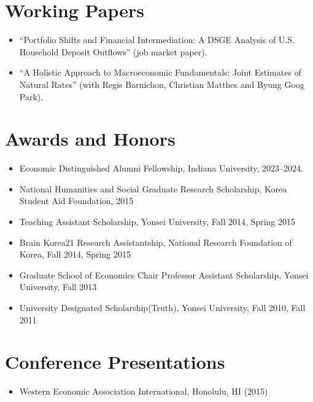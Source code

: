 \documentclass[11pt,a4paper]{article}
\begin{document}
\section*{Working Papers} 
\begin{itemize}[leftmargin=*]
    \item ``Portfolio Shifts and Financial Intermediation: A DSGE Analysis of U.S. Household Deposit Outflows'' (job market paper).
    \item ``A Holistic Approach to Macroeconomic
        Fundamentals: Joint Estimates of
        Natural Rates'' (with Regis Barnichon, Christian Matthes and Byung Goog Park).    
\end{itemize}

\section*{Awards and Honors}
\begin{itemize}[leftmargin=*]   
\item Economic Distinguished Alumni Fellowship, Indiana University, 2023--2024.    
\item National Humanities and Social Graduate Research Scholarship, Korea Student Aid Foundation, 2015
\item Teaching Assistant Scholarship, Yonsei University, Fall 2014, Spring 2015
\item Brain Korea21 Research Assistantship, National Research Foundation of Korea, Fall 2014, Spring 2015
\item Graduate School of Economics Chair Professor Assistant Scholarship, Yonsei University, Fall 2013
\item University Designated Scholarship(Truth), Yonsei University, Fall 2010, Fall 2011
\end{itemize}

\section*{Conference Presentations}
\begin{itemize}[leftmargin=*]
    \item Western Economic Association International, Honolulu, HI (2015)    
\end{itemize}
\end{document}
